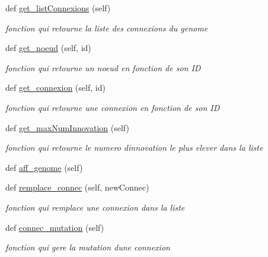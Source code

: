 \begin{DoxyCompactItemize}
def \hyperlink{classsrc_1_1_i_a_1_1genome_1_1_genome_a0df62962a25e45a73c0a0a4a899b8573}{get\+\_\+list\+Connexions} (self)
\begin{DoxyCompactList}\small\item\em fonction qui retourne la liste des connexions du genome \end{DoxyCompactList}\item 
def \hyperlink{classsrc_1_1_i_a_1_1genome_1_1_genome_a3ae6b59375d7cb648e6e65b299745136}{get\+\_\+noeud} (self, id)
\begin{DoxyCompactList}\small\item\em fonction qui retourne un noeud en fonction de son ID \end{DoxyCompactList}\item 
def \hyperlink{classsrc_1_1_i_a_1_1genome_1_1_genome_a07ebf660dfb9962a4ceeb078537c5fb1}{get\+\_\+connexion} (self, id)
\begin{DoxyCompactList}\small\item\em fonction qui retourne une connexion en fonction de son ID \end{DoxyCompactList}\item 
def \hyperlink{classsrc_1_1_i_a_1_1genome_1_1_genome_a8a5bbeda2d4dafaf999bf8d0a096157d}{get\+\_\+max\+Num\+Innovation} (self)
\begin{DoxyCompactList}\small\item\em fonction qui retourne le numero d\textquotesingle{}innovation le plus elever dans la liste \end{DoxyCompactList}\item 
def \hyperlink{classsrc_1_1_i_a_1_1genome_1_1_genome_ae5bfcd0f717f5aa7ac272aacdeb1a95d}{aff\+\_\+genome} (self)
\item 
def \hyperlink{classsrc_1_1_i_a_1_1genome_1_1_genome_aed3a26c1418ec0b34d654c6f9464b709}{remplace\+\_\+connec} (self, new\+Connec)
\begin{DoxyCompactList}\small\item\em fonction qui remplace une connexion dans la liste \end{DoxyCompactList}\item 
def \hyperlink{classsrc_1_1_i_a_1_1genome_1_1_genome_a2b233eb27662060165e583fb4e54f0d0}{connec\+\_\+mutation} (self)
\begin{DoxyCompactList}\small\item\em fonction qui gere la mutation d\textquotesingle{}une connexion \end{DoxyCompactList}\item 

\end{DoxyCompactItemize}
